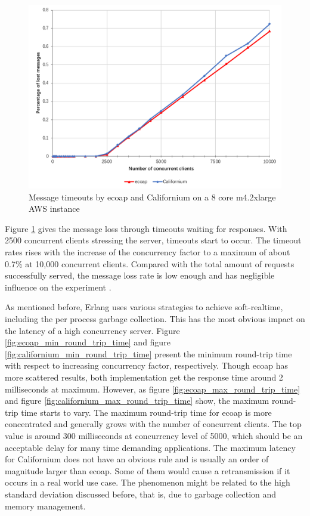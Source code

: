 \begin{figure}[!htbp]
\centering
\includegraphics[scale = 0.8]{message_loss_rate}
\caption{Message timeouts by ecoap and Californium on a 8 core m4.2xlarge AWS instance}
\label{fig:message_loss_rate}
\end{figure}

Figure \ref{fig:message_loss_rate} gives the message loss through timeouts waiting for responses. With 2500 concurrent clients stressing the server, timeouts start to occur. The timeout rates rises with the increase of the concurrency factor to a maximum of about 0.7\% at 10,000 concurrent clients. Compared with the total amount of requests successfully served, the message loss rate is low enough and has negligible influence on the experiment . 

As mentioned before, Erlang uses various strategies to achieve soft-realtime, including the per process garbage collection. This has the most obvious impact on the latency of a high concurrency server. Figure \ref{fig:ecoap_min_round_trip_time} and figure \ref{fig:californium_min_round_trip_time} present the minimum round-trip time with respect to increasing concurrency factor, respectively. Though ecoap has more scattered results, both implementation get the response time around 2 milliseconds at maximum. However, as figure \ref{fig:ecoap_max_round_trip_time} and figure \ref{fig:californium_max_round_trip_time} show, the maximum round-trip time starts to vary.
The maximum round-trip time for ecoap is more concentrated and generally grows with the number of concurrent clients. The top value is around 300 milliseconds at concurrency level of 5000, which should be an acceptable delay for many time demanding applications. The maximum latency for Californium does not have an obvious rule and is usually an order of magnitude larger than ecoap. Some of them would cause a retransmission if it occurs in a real world use case. The phenomenon might be related to the high standard deviation discussed before, that is, due to garbage collection and memory management. 

